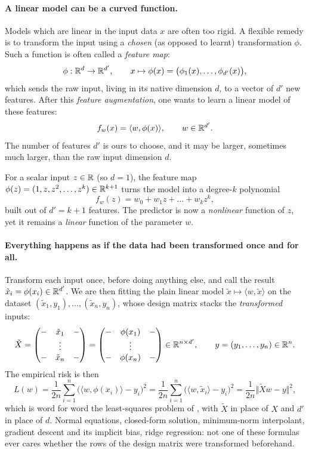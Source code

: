 \paragraph{A linear model can be a curved function.}
Models which are linear in the input data $x$ are often too rigid. A flexible remedy is to transform the input using a \emph{chosen} (as opposed to learnt) transformation $\phi$. Such a function is often called a \emph{feature map}:
\[
\phi : \mathbb{R}^{d} \to \mathbb{R}^{d'}, \qquad x \mapsto \phi(x) = \big( \phi_1(x), \dots, \phi_{d'}(x) \big),
\]
which sends the raw input, living in its native dimension $d$, to a vector of
$d'$ new features. After this \emph{feature augmentation}, one wants to learn a linear model of these features:
\[
f_w(x) = \langle w, \phi(x) \rangle,
\qquad w \in \mathbb{R}^{d'} .
\]
The number of features $d'$ is ours to choose, and it may be larger, sometimes
much larger, than the raw input dimension $d$.

\begin{example}
\label{ex:poly-features}
For a scalar input $z \in \mathbb{R}$ (so $d = 1$), the feature map
$\phi(z) = (1, z, z^2, \dots, z^k) \in \mathbb{R}^{k+1}$ turns the model into a
degree-$k$ polynomial
\[  
f_w(z) = w_0 + w_1 z + \dots + w_k z^k ,
\]
built out of $d' = k+1$ features. The predictor is now a \emph{nonlinear}
function of $z$, yet it remains a \emph{linear} function of the parameter $w$.
\end{example}




\paragraph{Everything happens as if the data had been transformed once and for all.}
Transform each input once, before doing anything else, and call the result
$\tilde{x}_i = \phi(x_i) \in \mathbb{R}^{d'}$. We are then fitting the plain linear
model $\tilde{x} \mapsto \langle w, \tilde{x} \rangle$ on the dataset
$(\tilde{x}_1, y_1), \dots, (\tilde{x}_n, y_n)$, whose design matrix stacks the
\emph{transformed} inputs:
\[
\tilde{X} = \begin{pmatrix}
- & \tilde{x}_1 & - \\
  & \vdots &  \\
- & \tilde{x}_n & -
\end{pmatrix} = \begin{pmatrix}
- & \phi(x_1) & - \\
  & \vdots &  \\
- & \phi(x_n) & -
\end{pmatrix} \in \mathbb{R}^{n \times d'},
\qquad
y = (y_1, \dots, y_n) \in \mathbb{R}^n .
\]
The empirical risk is then
\[
L(w) = \frac{1}{2n} \sum_{i=1}^n \big( \langle w, \phi(x_i) \rangle - y_i \big)^2
 = \frac{1}{2n} \sum_{i=1}^n \big( \langle w, \tilde{x}_i \rangle - y_i \big)^2
     = \frac{1}{2n} \big\Vert \tilde{X} w - y \big\Vert^2 ,
\]
which is word for word the least-squares problem of ,
with $\tilde{X}$ in place of $X$ and $d'$ in place of $d$. Normal equations,
closed-form solution, minimum-norm interpolant, gradient descent and its
implicit bias, ridge regression: not one of these formulas ever cares whether
the rows of the design matrix were transformed beforehand. 


